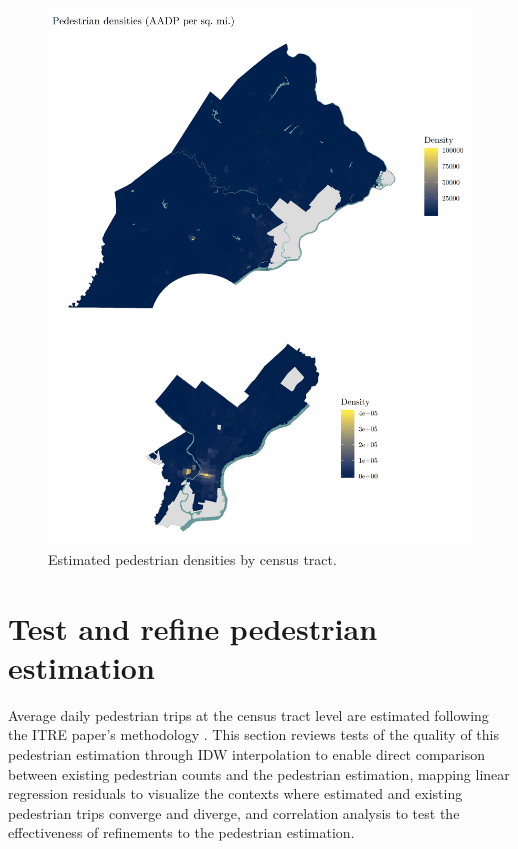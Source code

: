 \documentclass[paper=letterpaper, fontsize=11pt]{scrartcl}
\begin{document}
\begin{figure}[p]
	\centering
	\includegraphics[width = \textwidth]{estdens.png}
	\caption{Estimated pedestrian densities by census tract.} \label{estdens}
\end{figure}

\section{Test and refine pedestrian estimation}
\label{sec:test-peds}
Average daily pedestrian trips at the census tract level are estimated following the ITRE paper's methodology \cite{ncstate}. This section reviews tests of the quality of this pedestrian estimation through IDW interpolation to enable direct comparison between existing pedestrian counts and the pedestrian estimation, mapping linear regression residuals to visualize the contexts where estimated and existing pedestrian trips converge and diverge, and correlation analysis to test the effectiveness of refinements to the pedestrian estimation.
\end{document}
